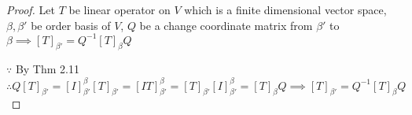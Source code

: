 \begin{proof}
	Let $T$ be linear operator on $V$ which is a finite dimensional vector space, $\beta,\beta'$ be order basis of $V$, $Q$ be a change coordinate matrix from $\beta'$ to $\beta \implies [T]_{\beta'} = Q^{-1}[T]_{\beta}Q$
	
	$\because$ By Thm 2.11 $\therefore Q[T]_{\beta'} = [I]^{\beta}_{\beta'}[T]_{\beta'} = [IT]^{\beta}_{\beta'} = [T]_{\beta'}[I]^{\beta}_{\beta'} = [T]_{\beta}Q \implies [T]_{\beta'} = Q^{-1}[T]_{\beta}Q$
\end{proof}
